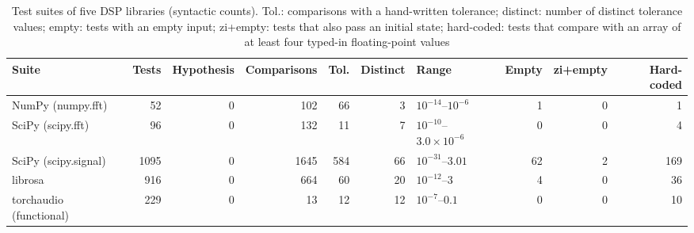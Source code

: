 \begin{table}[t]
\caption{Test suites of five DSP libraries (syntactic counts). Tol.: comparisons with a hand-written tolerance; distinct: number of distinct tolerance values; empty: tests with an empty input; zi+empty: tests that also pass an initial state; hard-coded: tests that compare with an array of at least four typed-in floating-point values}
\label{tab:survey}
\centering\footnotesize
\begin{tabular}{@{}lrrrrrlrrr@{}}
\toprule
Suite & Tests & Hypothesis & Comparisons & Tol. & Distinct & Range & Empty & zi+empty & Hard-coded \\
\midrule
NumPy (numpy.fft) & 52 & 0 & 102 & 66 & 3 & $10^{-14}$--$10^{-6}$ & 1 & 0 & 1 \\
SciPy (scipy.fft) & 96 & 0 & 132 & 11 & 7 & $10^{-10}$--$3.0\times10^{-6}$ & 0 & 0 & 4 \\
SciPy (scipy.signal) & 1095 & 0 & 1645 & 584 & 66 & $10^{-31}$--$3.01$ & 62 & 2 & 169 \\
librosa & 916 & 0 & 664 & 60 & 20 & $10^{-12}$--$3$ & 4 & 0 & 36 \\
torchaudio (functional) & 229 & 0 & 13 & 12 & 12 & $10^{-7}$--$0.1$ & 0 & 0 & 10 \\
\bottomrule
\end{tabular}
\end{table}
